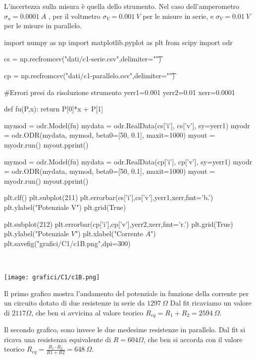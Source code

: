 L'incertezza sulla misura è quella dello strumento. Nel caso dell'amperometro $\sigma_a = 0.0001\ A$ , per il voltmetro
$\sigma_V = 0.001\ V$ per le misure in serie, e $\sigma_V = 0.01\ V$ per le misure in parallelo.
\\

\begin{sagesilent}
 
 import numpy as np
 import matplotlib.pyplot as plt
 from scipy import odr

 cs = np.recfromcsv("dati/c1-serie.csv",delimiter="\t")
 
 cp = np.recfromcsv("dati/c1-parallelo.csv",delimiter="\t")

 #Errori presi da risoluzione strumento
 yerr1=0.001
 yerr2=0.01
 xerr=0.0001
 
 def fu(P,x):
    return P[0]*x + P[1]

 mymod = odr.Model(fu)
 mydata = odr.RealData(cs['i'], cs['v'], sy=yerr1)
 myodr = odr.ODR(mydata, mymod, beta0=[50, 0.1], maxit=1000)
 myout = myodr.run()
 myout.pprint()
 
 mymod = odr.Model(fu)
 mydata = odr.RealData(cp['i'], cp['v'], sy=yerr1)
 myodr = odr.ODR(mydata, mymod, beta0=[50, 0.1], maxit=1000)
 myout = myodr.run()
 myout.pprint()

 plt.clf()
 plt.subplot(211)
 plt.errorbar(cs['i'],cs['v'],yerr1,xerr,fmt='b.')
 plt.ylabel("Potenziale V")
 plt.grid(True)
 
 plt.subplot(212)
 plt.errorbar(cp['i'],cp['v'],yerr2,xerr,fmt='r.')
 plt.grid(True)
 plt.ylabel("Potenziale $V$")
 plt.xlabel("Corrente $A$")
 plt.savefig("grafici/C1/c1B.png",dpi=300)
 
\end{sagesilent}


\


\texttt{[image: grafici/C1/c1B.png]}

Il primo grafico mostra l'andamento del potenziale in funzione della corrente per un circuito dotato di due resistenze in serie da $1297\ \Omega$
Dal fit ricaviamo un valore di $2117 \Omega$, che ben si avvicina al valore teorico $R_{eq}=R_1+R_2= 2594\ \Omega$.

Il secondo grafico, sono invece le due medesime resistenze in parallelo. Dal fit si ricava una resistenza equivalente di
$R = 604 \Omega$, che ben si accorda con il valore teorico $R_{eq} = \frac{R_1 \cdot R_2}{R1+R2}=648\ \Omega$.

